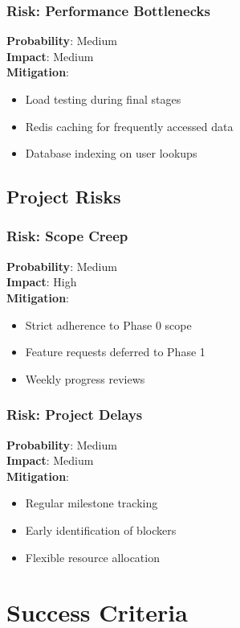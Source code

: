 \documentclass[12pt,a4paper]{article}
\begin{document}
\subsubsection{Risk: Performance Bottlenecks}
\textbf{Probability}: Medium\\
\textbf{Impact}: Medium\\
\textbf{Mitigation}:
\begin{itemize}
    \item Load testing during final stages
    \item Redis caching for frequently accessed data
    \item Database indexing on user lookups
\end{itemize}

\subsection{Project Risks}

\subsubsection{Risk: Scope Creep}
\textbf{Probability}: Medium\\
\textbf{Impact}: High\\
\textbf{Mitigation}:
\begin{itemize}
    \item Strict adherence to Phase 0 scope
    \item Feature requests deferred to Phase 1
    \item Weekly progress reviews
\end{itemize}

\subsubsection{Risk: Project Delays}
\textbf{Probability}: Medium\\
\textbf{Impact}: Medium\\
\textbf{Mitigation}:
\begin{itemize}
    \item Regular milestone tracking
    \item Early identification of blockers
    \item Flexible resource allocation
\end{itemize}

\section{Success Criteria}
\end{document}
